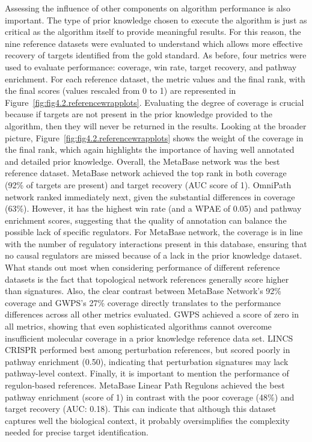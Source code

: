 Assessing the influence of other components on algorithm performance is also important.
The type of prior knowledge chosen to execute the algorithm is just as critical as the algorithm itself to provide meaningful results.
For this reason, the nine reference datasets were evaluated to understand which allows more effective recovery of targets identified from the gold standard.
As before, four metrics were used to evaluate performance: coverage, win rate, target recovery, and pathway enrichment.
For each reference dataset, the metric values and the final rank, with the final scores (values rescaled from 0 to 1) are represented in Figure~\ref{fig:fig4.2.referencewrapplots}.
Evaluating the degree of coverage is crucial because if targets are not present in the prior knowledge provided to the algorithm, then they will never be returned in the results.
Looking at the broader picture, Figure~\ref{fig:fig4.2.referencewrapplots} shows the weight of the coverage in the final rank, which again highlights the importance of having well annotated and detailed prior knowledge.
Overall, the MetaBase network was the best reference dataset. MetaBase network achieved the top rank in both coverage (92\% of targets are present) and target recovery (\gls{AUC} score of 1).
OmniPath network ranked immediately next, given the substantial differences in coverage (63\%).
However, it has the highest win rate (and a \gls{WPAE} of 0.05) and pathway enrichment scores, suggesting that the quality of annotation can balance the possible lack of specific regulators.
For MetaBase network, the coverage is in line with the number of regulatory interactions present in this database, ensuring that no causal regulators are missed because of a lack in the prior knowledge dataset.
What stands out most when considering performance of different reference datasets is the fact that topological network references generally score higher than signatures.
Also, the clear contrast between MetaBase Network's 92\% coverage and \gls{GWPS}'s 27\% coverage directly translates to the performance differences across all other metrics evaluated. \gls{GWPS} achieved a score of zero in all metrics, showing that even sophisticated algorithms cannot overcome insufficient molecular coverage in a prior knowledge reference data set. \gls{LINCS} \gls{CRISPR} performed best among perturbation references, but scored poorly in pathway enrichment (0.50), indicating that perturbation signatures may lack pathway-level context.
Finally, it is important to mention the performance of regulon-based references.
MetaBase Linear Path Regulons achieved the best pathway enrichment (score of 1) in contrast with the poor coverage (48\%) and target recovery (\gls{AUC}: 0.18).
This can indicate that although this dataset captures well the biological context, it probably oversimplifies the complexity needed for precise target identification.

